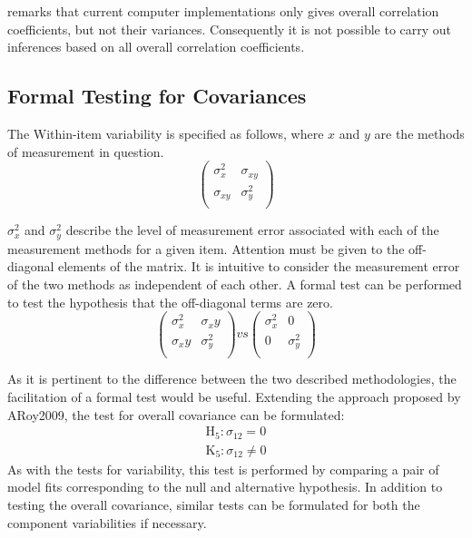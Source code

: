 \documentclass[12pt, a4paper]{report}
\theoremstyle{plain}
\theoremstyle{definition}
\theoremstyle{remark}
\begin{document}
\citet{ARoy2009} remarks that current computer implementations only gives overall correlation coefficients, but not their variances. Consequently it is not possible to carry out inferences based on all overall correlation coefficients.
	\subsection{Formal Testing for Covariances} %
	
	The Within-item variability is specified as follows, where $x$ and $y$ are the methods of measurement in question.
	\[ \left(
	\begin{array}{cc}
	\sigma^2_x & \sigma_{xy} \\
	\sigma_{xy} & \sigma^2_y \\
	\end{array}
	\right)
	\]
	
	$\sigma^2_x$ and $\sigma^2_y$ describe the level of measurement error associated with each of the measurement methods for a given item. Attention must be given to the off-diagonal elements of the matrix. It is intuitive to consider the measurement error of the two methods as independent of each other. A formal test can be performed to test the hypothesis that the off-diagonal terms are zero.
	\[ \left(
	\begin{array}{cc}
	\sigma^2_x & \sigma_xy \\
	\sigma_xy & \sigma^2_y \\
	\end{array}
	\right) vs \left(
	\begin{array}{cc}
	\sigma^2_x & 0 \\
	0 & \sigma^2_y \\
	\end{array}
	\right)
	\]
	
As it is pertinent to the difference between the two described methodologies, the facilitation of a formal test would be useful. Extending the approach proposed by ARoy2009, the test for overall covariance can be formulated:
	\begin{eqnarray*}
		\operatorname{H_5} : \sigma_{12} = 0 \\
		\operatorname{K_5} : \sigma_{12} \neq 0
	\end{eqnarray*}
As with the tests for variability, this test is performed by comparing a pair of model fits corresponding to the null and alternative hypothesis. In addition to testing the overall covariance, similar tests can be formulated for both the component variabilities if necessary.
	
\end{document}
